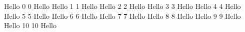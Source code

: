 \documentclass[12pt]{article}
\begin{document}
Hello 0
0 Hello
\newpage
Hello 1
1 Hello
\newpage
Hello 2
2 Hello
\newpage
Hello 3
3 Hello
\newpage
Hello 4
4 Hello
\newpage
Hello 5
5 Hello
\newpage
Hello 6
6 Hello
\newpage
Hello 7
7 Hello
\newpage
Hello 8
8 Hello
\newpage
Hello 9
9 Hello
\newpage
Hello 10
10 Hello
\newpage
\end{document}
